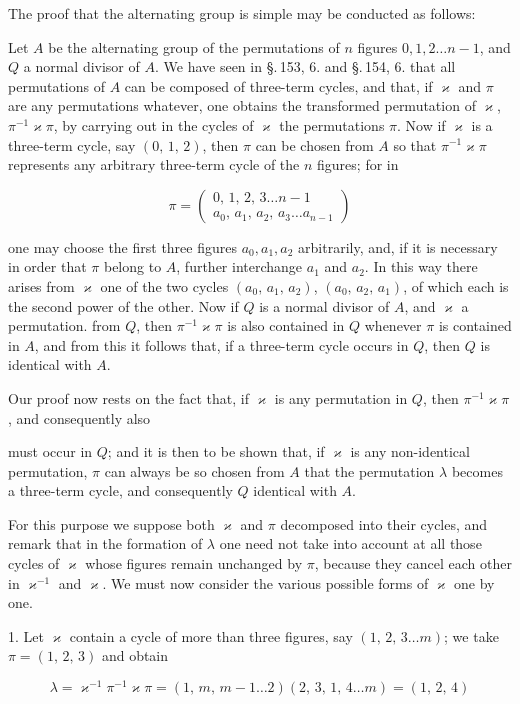 
The proof that the alternating group is simple may be conducted as follows:

Let $A$ be the alternating group of the permutations of $n$ figures $0, 1, 2 \ldots n-1$, and $Q$ a normal divisor of $A$. We have seen in \S.\,153, 6. and \S.\,154, 6. that all permutations of $A$ can be composed of three-term cycles, and that, if $\varkappa$ and $\pi$ are any permutations whatever, one obtains the transformed permutation of $\varkappa$, $\pi^{-1}\varkappa\pi$, by carrying out in the cycles of $\varkappa$ the permutations $\pi$. Now if $\varkappa$ is a three-term cycle, say $(0,\,1,\,2)$, then $\pi$ can be chosen from $A$ so that $\pi^{-1}\varkappa\pi$ represents any arbitrary three-term cycle of the $n$ figures; for in

\[
\pi = \begin{pmatrix} 0,\,1,\,2,\,3 \ldots n-1 \\ a_0,\,a_1,\,a_2,\,a_3 \ldots a_{n-1} \end{pmatrix}
\]

one may choose the first three figures $a_0, a_1, a_2$ arbitrarily, and, if it is necessary in order that $\pi$ belong to $A$, further interchange $a_1$ and $a_2$. In this way there arises from $\varkappa$ one of the two cycles $(a_0,\,a_1,\,a_2)$, $(a_0,\,a_2,\,a_1)$, of which each is the second power of the other. Now if $Q$ is a normal divisor of $A$, and $\varkappa$ a permutation. from $Q$, then $\pi^{-1}\varkappa\pi$ is also contained in $Q$ whenever $\pi$ is contained in $A$, and from this it follows that, if a three-term cycle occurs in $Q$, then $Q$ is identical with $A$.

Our proof now rests on the fact that, if $\varkappa$ is any permutation in $Q$, then $\pi^{-1}\varkappa\pi$, and consequently also


must occur in $Q$; and it is then to be shown that, if $\varkappa$ is any non-identical permutation, $\pi$ can always be so chosen from $A$ that the permutation $\lambda$ becomes a three-term cycle, and consequently $Q$ identical with $A$.

For this purpose we suppose both $\varkappa$ and $\pi$ decomposed into their cycles, and remark that in the formation of $\lambda$ one need not take into account at all those cycles of $\varkappa$ whose figures remain unchanged by $\pi$, because they cancel each other in $\varkappa^{-1}$ and $\varkappa$. We must now consider the various possible forms of $\varkappa$ one by one.

1. Let $\varkappa$ contain a cycle of more than three figures, say $(1,\,2,\,3 \ldots m)$; we take $\pi = (1,\,2,\,3)$ and obtain

\[
\lambda = \varkappa^{-1}\pi^{-1}\varkappa\pi = (1,\,m,\,m-1 \ldots 2)(2,\,3,\,1,\,4 \ldots m) = (1,\,2,\,4)
\]
